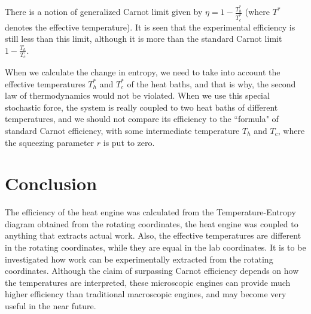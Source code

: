 \documentclass[12pt, twoside]{article}
\begin{document}
There is a notion of generalized Carnot limit given by $\eta = 1 - \frac{T^*_{h}}{T^*_{c}}$ (where $T^*$ denotes the effective temperature). It is seen that the experimental efficiency is still less than this limit, although it is more than the standard Carnot limit $1 - \frac{T_{h}}{T_{c}}$. 

When we calculate the change in entropy, we need to take into account the effective temperatures  ${T^*_{h}}$ and ${T^*_{c}}$ of the heat baths, and that is why, the second law of thermodynamics would not be violated. When we use this special stochastic force, the system is really coupled to two heat baths of different temperatures, and we should not compare its efficiency to the ``formula" of standard Carnot efficiency, with some intermediate temperature $T_{h}$ and $T_{c}$, where the squeezing parameter $r$ is put to zero.

\section{Conclusion}
The efficiency of the heat engine was calculated from the Temperature-Entropy diagram obtained from the rotating coordinates, the heat engine was coupled to anything that extracts actual work. Also, the effective temperatures are different in the rotating coordinates, while they are equal in the lab coordinates. It is to be investigated how work can be experimentally extracted from the rotating coordinates. Although the claim of surpassing Carnot efficiency depends on how the temperatures are interpreted, these microscopic engines can provide much higher efficiency than traditional macroscopic engines, and may become very useful in the near future.




\end{document}

